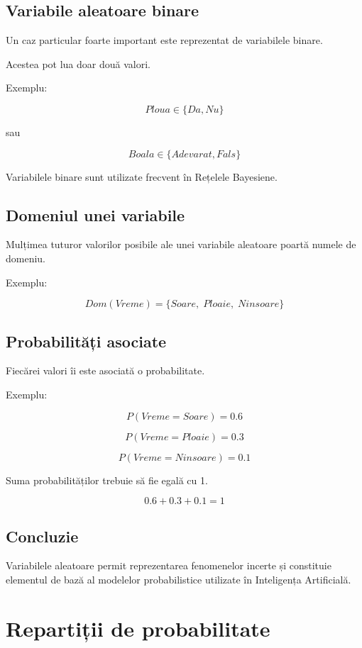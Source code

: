 \documentclass[12pt,a4paper]{article}
\begin{document}
\subsection{Variabile aleatoare binare}

Un caz particular foarte important este reprezentat de variabilele binare.

Acestea pot lua doar două valori.

Exemplu:

\[
Ploua \in \{Da, Nu\}
\]

sau

\[
Boala \in \{Adevarat, Fals\}
\]

Variabilele binare sunt utilizate frecvent în Rețelele Bayesiene.

\subsection{Domeniul unei variabile}

Mulțimea tuturor valorilor posibile ale unei variabile aleatoare poartă numele de domeniu.

Exemplu:

\[
Dom(Vreme)=
\{Soare,\;Ploaie,\;Ninsoare\}
\]

\subsection{Probabilități asociate}

Fiecărei valori îi este asociată o probabilitate.

Exemplu:

\[
P(Vreme=Soare)=0.6
\]

\[
P(Vreme=Ploaie)=0.3
\]

\[
P(Vreme=Ninsoare)=0.1
\]

Suma probabilităților trebuie să fie egală cu 1.

\[
0.6+0.3+0.1=1
\]

\subsection{Concluzie}

Variabilele aleatoare permit reprezentarea fenomenelor incerte și constituie elementul de bază al modelelor probabilistice utilizate în Inteligența Artificială.



\section{Repartiții de probabilitate}
\end{document}
